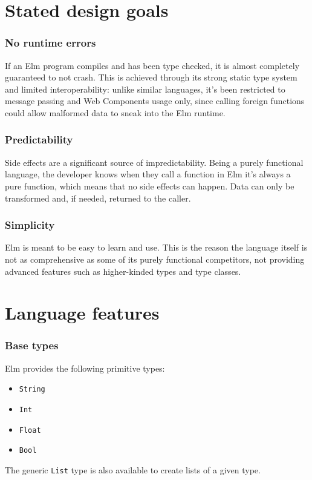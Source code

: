 \section{Stated design goals}

\subsubsection{No runtime errors}
If an Elm program compiles and has been type checked, it is almost completely guaranteed to not crash. This is achieved through its strong static type system and limited interoperability: unlike similar languages, it's been restricted to message passing and Web Components usage only, since calling foreign functions could allow malformed data to sneak into the Elm runtime.

\subsubsection{Predictability}
Side effects are a significant source of impredictability. Being a purely functional language, the developer knows when they call a function in Elm it's always a pure function, which means that no side effects can happen. Data can only be transformed and, if needed, returned to the caller.

\subsubsection{Simplicity}
Elm is meant to be easy to learn and use. This is the reason the language itself is not as comprehensive as some of its purely functional competitors, not providing advanced features such as higher-kinded types and type classes.

\section{Language features}
\subsubsection{Base types}
Elm provides the following primitive types:
\begin{itemize}
    \item \texttt{String}
    \item \texttt{Int}
    \item \texttt{Float}
    \item \texttt{Bool}
\end{itemize}
The generic \texttt{List} type is also available to create lists of a given type.\\

